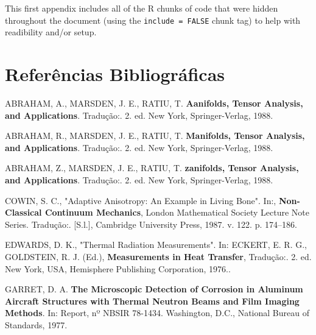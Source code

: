 \documentclass[grad,numbers]{coppe}
\begin{document}
  This first appendix includes all of the R chunks of code that were hidden throughout the document (using the \texttt{include\ =\ FALSE} chunk tag) to help with readibility and/or setup.
  
  \backmatter
  
  \hypertarget{referuxeancias-bibliogruxe1ficas}{%
  \chapter*{Referências Bibliográficas}\label{referuxeancias-bibliogruxe1ficas}}
  
  
  \label{bib:begin}
  \noindent
  
  \setlength{\parindent}{-0.20in}
  \setlength{\leftskip}{0.20in}
  \setlength{\parskip}{8pt}
  
  \hypertarget{refs}{}
  \leavevmode\hypertarget{ref-teste-1}{}%
  ABRAHAM, A., MARSDEN, J. E., RATIU, T. \textbf{Aanifolds, Tensor Analysis, and Applications}. Tradução:. 2. ed. New York, Springer-Verlag, 1988.
  
  \leavevmode\hypertarget{ref-book-example}{}%
  ABRAHAM, R., MARSDEN, J. E., RATIU, T. \textbf{Manifolds, Tensor Analysis, and Applications}. Tradução:. 2. ed. New York, Springer-Verlag, 1988.
  
  \leavevmode\hypertarget{ref-teste-2}{}%
  ABRAHAM, Z., MARSDEN, J. E., RATIU, T. \textbf{zanifolds, Tensor Analysis, and Applications}. Tradução:. 2. ed. New York, Springer-Verlag, 1988.
  
  \leavevmode\hypertarget{ref-incollection-example}{}%
  COWIN, S. C., "Adaptive Anisotropy: An Example in Living Bone". In:, \textbf{Non-Classical Continuum Mechanics}, London Mathematical Society Lecture Note Series. Tradução:. {[}S.l.{]}, Cambridge University Press, 1987. v. 122. p. 174--186.
  
  \leavevmode\hypertarget{ref-inbook-example}{}%
  EDWARDS, D. K., "Thermal Radiation Measurements". In: ECKERT, E. R. G., GOLDSTEIN, R. J. (Ed.), \textbf{Measurements in Heat Transfer}, Tradução:. 2. ed. New York, USA, Hemisphere Publishing Corporation, 1976..
  
  \leavevmode\hypertarget{ref-techreport-exampleIn}{}%
  GARRET, D. A. \textbf{The Microscopic Detection of Corrosion in Aluminum Aircraft Structures with Thermal Neutron Beams and Film Imaging Methods}. In: Report, nº NBSIR 78-1434. Washington, D.C., National Bureau of Standards, 1977.
  
\end{document}
